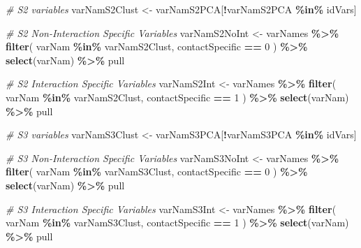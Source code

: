 \documentclass[
]{article}
\newenvironment{Shaded}{\begin{snugshade}}{\end{snugshade}}
\newcommand{\CommentTok}[1]{\textcolor[rgb]{0.56,0.35,0.01}{\textit{#1}}}
\newcommand{\DecValTok}[1]{\textcolor[rgb]{0.00,0.00,0.81}{#1}}
\newcommand{\FunctionTok}[1]{\textcolor[rgb]{0.13,0.29,0.53}{\textbf{#1}}}
\newcommand{\NormalTok}[1]{#1}
\newcommand{\OtherTok}[1]{\textcolor[rgb]{0.56,0.35,0.01}{#1}}
\newcommand{\SpecialCharTok}[1]{\textcolor[rgb]{0.81,0.36,0.00}{\textbf{#1}}}
\begin{document}
\begin{Shaded}
\begin{Highlighting}[]
\CommentTok{\# S2 variables}
\NormalTok{varNamS2Clust }\OtherTok{\textless{}{-}}\NormalTok{ varNamS2PCA[}\SpecialCharTok{!}\NormalTok{varNamS2PCA }\SpecialCharTok{\%in\%}\NormalTok{ idVars]}

\CommentTok{\# S2 Non{-}Interaction Specific Variables}
\NormalTok{varNamS2NoInt }\OtherTok{\textless{}{-}}\NormalTok{ varNames }\SpecialCharTok{\%\textgreater{}\%}
  \FunctionTok{filter}\NormalTok{(}
\NormalTok{    varNam }\SpecialCharTok{\%in\%}\NormalTok{ varNamS2Clust,}
\NormalTok{    contactSpecific }\SpecialCharTok{==} \DecValTok{0}
\NormalTok{  ) }\SpecialCharTok{\%\textgreater{}\%}
  \FunctionTok{select}\NormalTok{(varNam) }\SpecialCharTok{\%\textgreater{}\%}
\NormalTok{  pull}

\CommentTok{\# S2 Interaction Specific Variables}
\NormalTok{varNamS2Int }\OtherTok{\textless{}{-}}\NormalTok{ varNames }\SpecialCharTok{\%\textgreater{}\%}
  \FunctionTok{filter}\NormalTok{(}
\NormalTok{    varNam }\SpecialCharTok{\%in\%}\NormalTok{ varNamS2Clust,}
\NormalTok{    contactSpecific }\SpecialCharTok{==} \DecValTok{1}
\NormalTok{  ) }\SpecialCharTok{\%\textgreater{}\%}
  \FunctionTok{select}\NormalTok{(varNam) }\SpecialCharTok{\%\textgreater{}\%}
\NormalTok{  pull}

\CommentTok{\# S3 variables}
\NormalTok{varNamS3Clust }\OtherTok{\textless{}{-}}\NormalTok{ varNamS3PCA[}\SpecialCharTok{!}\NormalTok{varNamS3PCA }\SpecialCharTok{\%in\%}\NormalTok{ idVars]}

\CommentTok{\# S3 Non{-}Interaction Specific Variables}
\NormalTok{varNamS3NoInt }\OtherTok{\textless{}{-}}\NormalTok{ varNames }\SpecialCharTok{\%\textgreater{}\%}
  \FunctionTok{filter}\NormalTok{(}
\NormalTok{    varNam }\SpecialCharTok{\%in\%}\NormalTok{ varNamS3Clust,}
\NormalTok{    contactSpecific }\SpecialCharTok{==} \DecValTok{0}
\NormalTok{  ) }\SpecialCharTok{\%\textgreater{}\%}
  \FunctionTok{select}\NormalTok{(varNam) }\SpecialCharTok{\%\textgreater{}\%}
\NormalTok{  pull}

\CommentTok{\# S3 Interaction Specific Variables}
\NormalTok{varNamS3Int }\OtherTok{\textless{}{-}}\NormalTok{ varNames }\SpecialCharTok{\%\textgreater{}\%}
  \FunctionTok{filter}\NormalTok{(}
\NormalTok{    varNam }\SpecialCharTok{\%in\%}\NormalTok{ varNamS3Clust,}
\NormalTok{    contactSpecific }\SpecialCharTok{==} \DecValTok{1}
\NormalTok{  ) }\SpecialCharTok{\%\textgreater{}\%}
  \FunctionTok{select}\NormalTok{(varNam) }\SpecialCharTok{\%\textgreater{}\%}
\NormalTok{  pull}
\end{Highlighting}
\end{Shaded}
\end{document}
